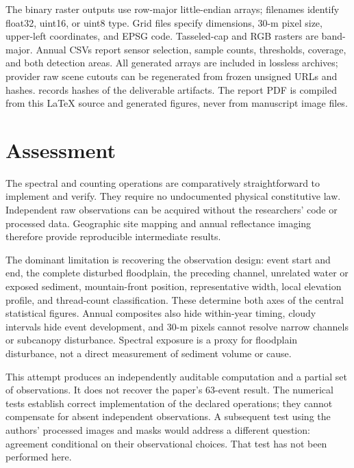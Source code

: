 \documentclass[11pt]{article}
\newcommand{\artifact}[1]{\path{#1}}
\begin{document}
The binary raster outputs use row-major little-endian arrays; filenames identify
float32, uint16, or uint8 type. Grid files specify dimensions, 30-m pixel size,
upper-left coordinates, and EPSG code. Tasseled-cap and RGB rasters are
band-major. Annual CSVs report sensor selection, sample counts, thresholds,
coverage, and both detection areas. All generated arrays are included in
lossless archives; provider raw scene cutouts can be regenerated from frozen
unsigned URLs and hashes. \artifact{data/results/artifact_sha256.json} records
hashes of the deliverable artifacts. The report PDF is compiled from this
LaTeX source and generated figures, never from manuscript image files.

\section{Assessment}
The spectral and counting operations are comparatively straightforward to
implement and verify. They require no undocumented physical constitutive law.
Independent raw observations can be acquired without the researchers' code
or processed data. Geographic site mapping and annual reflectance imaging
therefore provide reproducible intermediate results.

The dominant limitation is recovering the observation design: event start
and end, the complete disturbed floodplain, the preceding channel, unrelated
water or exposed sediment, mountain-front position, representative width,
local elevation profile, and thread-count classification. These determine
both axes of the central statistical figures. Annual composites also hide
within-year timing, cloudy intervals hide event development, and 30-m pixels
cannot resolve narrow channels or subcanopy disturbance. Spectral exposure
is a proxy for floodplain disturbance, not a direct measurement of sediment
volume or cause.

This attempt produces an independently auditable computation and a partial
set of observations. It does not recover the paper's 63-event result. The
numerical tests establish correct implementation of the declared operations;
they cannot compensate for absent independent observations. A subsequent test
using the authors' processed images and masks would address a different
question: agreement conditional on their observational choices. That test
has not been performed here.
\end{document}

